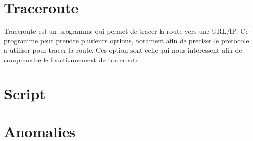\documentclass[5pt]{article}
\begin{document}
    \section{Traceroute}
    Traceroute est un programme qui permet de tracer la route vers une URL/IP. Ce programme peut prendre plusieurs options, notament afin de preciser le protocole a utiliser pour tracer la route. Ces option sont celle qui nous interessent afin de compremdre le fonctionnement de traceroute.


    \section{Script}
    
    \section{Anomalies}
\end{document}
